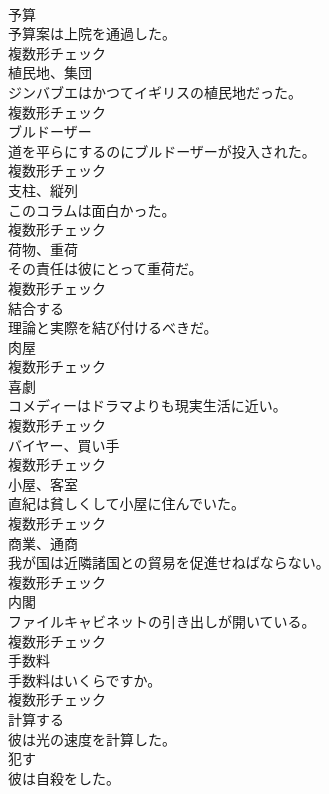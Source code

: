 \documentclass[8pt]{extreport}
\begin{document}
\begin{CJK}{UTF8}{min}
\\	[名詞]	予算	
\\	予算案は上院を通過した。	
\\	複数形チェック
\\	[名詞]	植⺠地、集団	
\\	ジンバブエはかつてイギリスの植民地だった。	
\\	複数形チェック
\\	[名詞]	ブルドーザー	
\\	道を平らにするのにブルドーザーが投入された。	
\\	複数形チェック
\\	[名詞]	支柱、縦列	
\\	このコラムは面白かった。	
\\	複数形チェック
\\	[名詞]	荷物、重荷	
\\	その責任は彼にとって重荷だ。	
\\	複数形チェック
\\	[動詞]	結合する	
\\	理論と実際を結び付けるべきだ。	
\\	[名詞]	肉屋	
\\	複数形チェック
\\	[名詞]	喜劇	
\\	コメディーはドラマよりも現実生活に近い。	
\\	複数形チェック
\\	[名詞]	バイヤー、買い手	
\\	複数形チェック
\\	[名詞]	小屋、客室	
\\	直紀は貧しくして小屋に住んでいた。	
\\	複数形チェック
\\	[名詞]	商業、通商	
\\	我が国は近隣諸国との貿易を促進せねばならない。	
\\	複数形チェック
\\	[名詞]	内閣	
\\	ファイルキャビネットの引き出しが開いている。	
\\	複数形チェック
\\	[名詞]	手数料	
\\	手数料はいくらですか。	
\\	複数形チェック
\\	[動詞]	計算する	
\\	彼は光の速度を計算した。	
\\	[動詞]	犯す	
\\	彼は自殺をした。	

\end{CJK}
\end{document}
